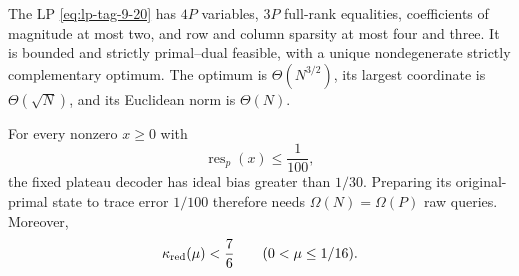 \begin{theorem}
\label{thm:lp-gain-plateau}
The LP \eqref{eq:lp-tag-9-20} has \(4P\) variables, \(3P\) full-rank equalities,
coefficients of magnitude at most two, and row and column sparsity at most
four and three.  It is bounded and strictly primal--dual feasible, with a
unique nondegenerate strictly complementary optimum.  The optimum is
\(\Theta(N^{3/2})\), its largest coordinate is \(\Theta(\sqrt N)\), and
its Euclidean norm is \(\Theta(N)\).

For every nonzero \(x\geq0\) with
\begin{equation}
 \operatorname{res}_p(x)\leq\frac1{100},
\label{eq:lp-tag-9-21}
\end{equation}
the fixed plateau decoder has ideal bias greater than \(1/30\).  Preparing
its original-primal state to trace error \(1/100\) therefore needs
\(\Omega(N)=\Omega(P)\) raw queries.  Moreover,
\begin{equation}
 \kappa_{\rm red}(\mu)<\frac76\qquad(0<\mu\leq1/16).
\label{eq:lp-tag-9-22}
\end{equation}
\end{theorem}

